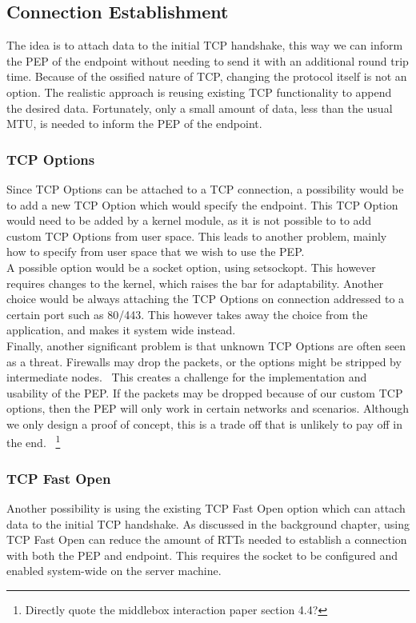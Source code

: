 \documentclass[a4paper,english, 11pt]{report}
\begin{document}
\subsection{Connection Establishment}  
The idea is to attach data to the initial TCP handshake, this way we can inform the PEP of the endpoint without needing to send it with an additional round trip time. Because of the ossified nature of TCP, changing the protocol itself is not an option. The realistic approach is reusing existing TCP functionality to append the desired data. Fortunately, only a small amount of data, less than the usual MTU, is needed to inform the PEP of the endpoint.

\subsubsection{TCP Options}
Since TCP Options can be attached to a TCP connection, a possibility would be to add a new TCP Option which would specify the endpoint. This TCP Option would need to be added by a kernel module, as it is not possible to to add custom TCP Options from user space. This leads to another problem, mainly how to specify from user space that we wish to use the PEP.\\
A possible option would be a socket option, using setsockopt. This however requires changes to the kernel, which raises the bar for adaptability. Another choice would be always attaching the TCP Options on connection addressed to a certain port such as 80/443. This however takes away the choice from the application, and makes it system wide instead.\\

Finally, another significant problem is that unknown TCP Options are often seen as a threat. Firewalls may drop the packets, or the options might be stripped by intermediate nodes.~\cite{middlebox_interactions} This creates a challenge for the implementation and usability of the PEP. If the packets may be dropped because of our custom TCP options, then the PEP will only work in certain networks and scenarios. Although we only design a proof of concept, this is a trade off that is unlikely to pay off in the end.~\cite{tcp_extendable}
\footnote{Directly quote the middlebox interaction paper section 4.4?}

\subsubsection{TCP Fast Open}
Another possibility is using the existing TCP Fast Open option which can attach data to the initial TCP handshake. As discussed in the background chapter, using TCP Fast Open can reduce the amount of RTTs needed to establish a connection with both the PEP and endpoint. This requires the socket to be configured and enabled system-wide on the server machine.
\end{document}
